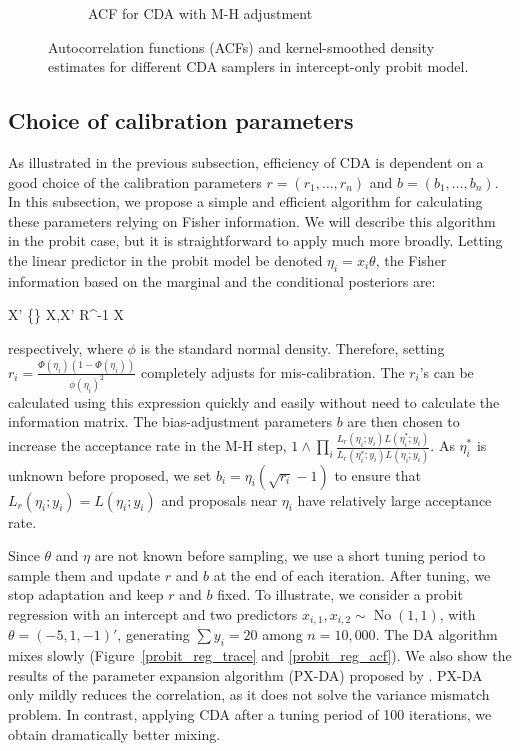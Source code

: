 \documentclass[10pt]{article}
\newcommand{\be}{\begin{equs}}
\newcommand{\ee}{\end{equs}}
\DeclareMathOperator{\No}{No}
\DeclareMathOperator{\diag}{diag}
\begin{document}
\begin{figure}[H]
\begin{subfigure}[b]{0.32\textwidth}
  \caption{ACF for CDA with M-H adjustment}
   \label{probit_demo_intercept_posteriorsample}
\end{subfigure}
  \hfill
  \caption{ Autocorrelation functions (ACFs) and kernel-smoothed density estimates for different CDA samplers in intercept-only probit model.}
 \label{probit_demo_intercept}
 \end{figure}


\subsection{Choice of calibration parameters} %

As illustrated in the previous subsection, efficiency of CDA is dependent on a good choice of the calibration parameters $r=(r_1,\ldots,r_n)$ and $b=(b_1,\ldots,b_n)$.  In this subsection, we propose a simple and efficient algorithm for calculating these parameters relying on Fisher information.  We will describe this algorithm in the probit case, but it is straightforward to apply much more broadly.  Letting the linear predictor in the probit model be denoted $\eta_i = x_i\theta$, the Fisher information based on the marginal and the conditional posteriors are:
\be
X' \diag\bigg\{\bigg\} X,\quad \quad X' R^{-1} X
\ee
respectively, where $\phi$ is the standard normal density. Therefore, setting $r_i = \frac{\Phi(\eta_i)(1- \Phi(\eta_i))} {\phi(\eta_i)^2}$ completely adjusts for mis-calibration.  The $r_i$'s can be calculated using this expression quickly and easily without need to calculate the information matrix.
The bias-adjustment parameters $b$ are then chosen to increase the acceptance rate in the M-H step, $1\wedge \prod_i \frac{   L_r(\eta_i;y_i) L(\eta_i^*;y_i)}{ L_r(\eta_i^*;y_i)L(\eta_i;y_i) }$. As $\eta_i^*$ is unknown before proposed, we set $b_i = \eta_i (\sqrt{r_i}-1)$ to ensure that $L_r(\eta_i;y_i) = L(\eta_i;y_i)$ and proposals near $\eta_i$ have relatively large acceptance rate.


Since $\theta$ and $\eta$ are not known before sampling, we use a short tuning period to sample them and update $r$ and $b$ at the end of each iteration.  After tuning, we stop adaptation and keep $r$ and $b$ fixed.  To illustrate, we consider a probit regression with an intercept and two predictors $x_{i,1},x_{i,2}\sim \No(1,1)$, with $\theta=(-5,1,-1)'$, generating $\sum y_i=20$ among $n=10,000$. The \cite{albert1993bayesian} DA algorithm mixes slowly (Figure~\ref{probit_reg_trace} and \ref{probit_reg_acf}). We also show the 
results of the parameter expansion algorithm (PX-DA) proposed by \cite{liu1999parameter}. PX-DA only mildly reduces the correlation, as it does not solve the variance mismatch problem.  In contrast, applying CDA after a tuning period of 100 iterations, we obtain dramatically better mixing.
\end{document}
